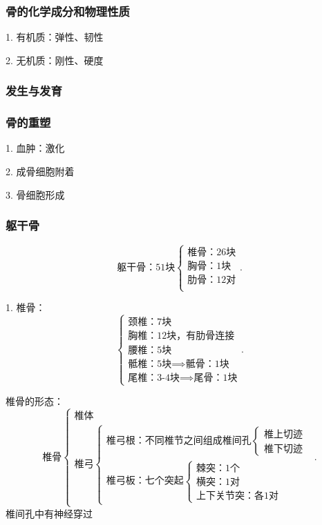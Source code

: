 \subsubsection*{骨的化学成分和物理性质}%
\label{subsub:骨的化学成分和物理性质}
1. 有机质：弹性、韧性

2. 无机质：刚性、硬度

\subsubsection*{发生与发育}%
\label{subsub:发生与发育}

\subsubsection*{骨的重塑}%
\label{subsub:骨的重塑}
1. 血肿：激化

2. 成骨细胞附着

3. 骨细胞形成
\subsubsection{躯干骨}%
\label{subsub:躯干骨}
\[
    \mbox{躯干骨：51块}
    \begin{cases}
        \mbox{椎骨：26块}\\ 
        \mbox{胸骨：1块}\\ 
        \mbox{肋骨：12对}\\ 
    \end{cases}
.\] 

1. 椎骨：
\[
    \begin{cases}
        \mbox{颈椎：7块}\\ 
        \mbox{胸椎：12块，有肋骨连接}\\ 
        \mbox{腰椎：5块}\\ 
        \mbox{骶椎：5块}\implies \mbox{骶骨：1块}\\
        \mbox{尾椎：3-4块}\implies \mbox{尾骨：1块}
    \end{cases}
.\] 

\begin{notation}
    椎骨的形态：
    \[
        \mbox{椎骨}
        \begin{cases}
            \mbox{椎体}\\ 
            \mbox{椎弓}
            \begin{cases}
                \mbox{椎弓根：不同椎节之间组成椎间孔}
                \begin{cases}
                    \mbox{椎上切迹}\\ 
                    \mbox{椎下切迹}
                \end{cases}\\
                \mbox{椎弓板：七个突起}
                \begin{cases}
                    \mbox{棘突：1个}\\ 
                    \mbox{横突：1对}\\ 
                    \mbox{上下关节突：各1对}
                \end{cases}
            \end{cases}
        \end{cases}
    .\] 
    椎间孔中有神经穿过
\end{notation}

